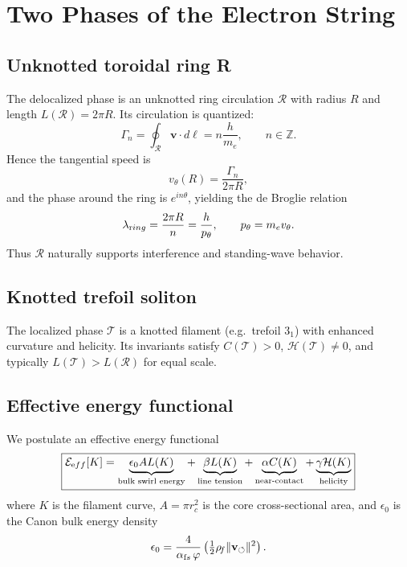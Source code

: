 \documentclass[11pt,a4paper]{article}
\newcommand{\rhof}{\rho_{\!f}}                           %
\begin{document}
\section{Two Phases of the Electron String}

    \subsection{Unknotted toroidal ring R}

        The delocalized phase is an unknotted ring circulation $\mathcal{R}$ with radius $R$ and length $L(\mathcal{R})=2\pi R$. Its circulation is quantized:
\begin{equation}
            \Gamma_n = \oint_{\mathcal{R}} \mathbf{v} \cdot d\boldsymbol{\ell} = n \frac{h}{m_e}, \qquad n\in \mathbb{Z} .
\end{equation}
Hence the tangential speed is
\begin{equation}
    v_\theta(R) = \frac{\Gamma_n}{2\pi R},
\end{equation}
        and the phase around the ring is $e^{i n\theta}$, yielding the de Broglie relation
\begin{equation}
    \lambda_{\textrm ring} = \frac{2\pi R}{n} = \frac{h}{p_\theta}, \qquad p_\theta = m_e v_\theta .
\end{equation}
        Thus $\mathcal{R}$ naturally supports interference and standing-wave behavior.

    \subsection{Knotted trefoil soliton }

        The localized phase $\mathcal{T}$ is a knotted filament (e.g.\ trefoil $3_1$) with enhanced curvature and helicity. Its invariants satisfy $C(\mathcal{T})>0$, $\mathcal{H}(\mathcal{T})\neq 0$, and typically $L(\mathcal{T})>L(\mathcal{R})$ for equal scale.

\subsection{Effective energy functional}

We postulate an effective energy functional
\begin{equation}
    \boxed{
        \mathcal{E}_{\textrm eff}[K] =
        \underbrace{\epsilon_0 A L(K)}_{\text{bulk swirl energy}} +
        \underbrace{\beta L(K)}_{\text{line tension}} +
        \underbrace{\alpha C(K)}_{\text{near-contact}} +
        \underbrace{\gamma \mathcal{H}(K)}_{\text{helicity}}
    }
\end{equation}
        where $K$ is the filament curve, $A=\pi r_c^2$ is the core cross-sectional area, and $\epsilon_0$ is the Canon bulk energy density
\begin{equation}
            \epsilon_0 = \frac{4}{\alpha_{\textrm fs}\,\varphi}\left(\tfrac12 \rhof \|\mathbf{v}_{\circlearrowleft}\|^2\right).
\end{equation}
\end{document}
